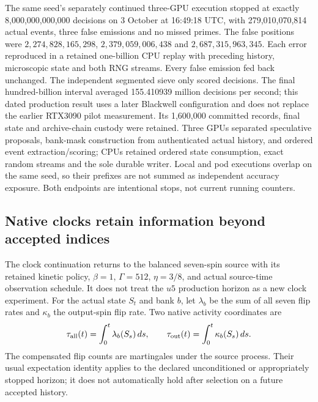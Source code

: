 The same seed's separately continued three-GPU execution stopped at exactly 8,000,000,000,000 decisions on 3 October at 16:49:18 UTC, with 279,010,070,814 actual events, three false emissions and no missed primes. The false positions were $2{,}274{,}828{,}165{,}298$, $2{,}379{,}059{,}006{,}438$ and $2{,}687{,}315{,}963{,}345$. Each error reproduced in a retained one-billion CPU replay with preceding history, microscopic state and both RNG streams. Every false emission fed back unchanged. The independent segmented sieve only scored decisions. The final hundred-billion interval averaged 155.410939 million decisions per second; this dated production result uses a later Blackwell configuration and does not replace the earlier RTX3090 pilot measurement. Its 1,600,000 committed records, final state and archive-chain custody were retained. Three GPUs separated speculative proposals, bank-mask construction from authenticated actual history, and ordered event extraction/scoring; CPUs retained ordered state consumption, exact random streams and the sole durable writer. Local and pod executions overlap on the same seed, so their prefixes are not summed as independent accuracy exposure. Both endpoints are intentional stops, not current running counters.

\subsection{Native clocks retain information beyond accepted indices}

The clock continuation returns to the balanced seven-spin source with its retained kinetic policy, $\beta=1$, $\Gamma=512$, $\eta=3/8$, and actual source-time observation schedule. It does not treat the $u5$ production horizon as a new clock experiment. For the actual state $S_t$ and bank $b$, let $\lambda_b$ be the sum of all seven flip rates and $\kappa_b$ the output-spin flip rate. Two native activity coordinates are
\[
 \tau_{\rm all}(t)=\int_0^t\lambda_b(S_s)\,ds,
 \qquad
 \tau_{\rm out}(t)=\int_0^t\kappa_b(S_s)\,ds.
\]
The compensated flip counts are martingales under the source process. Their usual expectation identity applies to the declared unconditioned or appropriately stopped horizon; it does not automatically hold after selection on a future accepted history.

